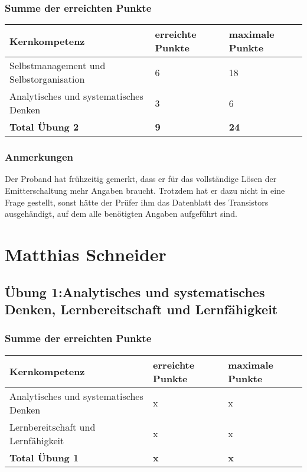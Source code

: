 \subsubsection{Summe der erreichten Punkte}

\begin{center}
  \begin{tabular}{ | p{7cm} | p{3cm} | p{3cm} |}
   \hline
   \textbf{Kernkompetenz} & \textbf{erreichte Punkte} & \textbf{maximale Punkte} \\ \hline
   Selbstmanagement und Selbstorganisation & 6 & 18\\ \hline
   Analytisches und systematisches Denken & 3 & 6\\ \hline
   \textbf{Total Übung 2} & \textbf{9} & \textbf{24}\\ \hline
  \end{tabular}
\end{center}

\subsubsection{Anmerkungen}
Der Proband hat frühzeitig gemerkt, dass er für das vollständige Lösen der Emitterschaltung mehr Angaben braucht. Trotzdem hat er dazu nicht in eine Frage gestellt, sonst hätte der Prüfer ihm das Datenblatt des Transistors ausgehändigt, auf dem alle benötigten Angaben aufgeführt sind.
\section{Matthias Schneider}
\subsection{Übung 1:Analytisches und systematisches Denken, Lernbereitschaft und Lernfähigkeit}
\subsubsection{Summe der erreichten Punkte}
\begin{center}
  \begin{tabular}{ | p{7cm} | p{3cm} | p{3cm} |}
   \hline
   \textbf{Kernkompetenz} & \textbf{erreichte Punkte} & \textbf{maximale Punkte} \\ \hline
   Analytisches und systematisches Denken & x & x\\ \hline
  Lernbereitschaft und Lernfähigkeit & x & x\\ \hline
   \textbf{Total Übung 1} & \textbf{x} & \textbf{x}\\ \hline
  \end{tabular}
\end{center}
